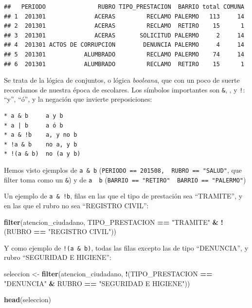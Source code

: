 \documentclass[spanish,]{book}
\newenvironment{Shaded}{\begin{snugshade}}{\end{snugshade}}
\newcommand{\KeywordTok}[1]{\textcolor[rgb]{0.13,0.29,0.53}{\textbf{#1}}}
\newcommand{\NormalTok}[1]{#1}
\newcommand{\OperatorTok}[1]{\textcolor[rgb]{0.81,0.36,0.00}{\textbf{#1}}}
\newcommand{\StringTok}[1]{\textcolor[rgb]{0.31,0.60,0.02}{#1}}
\begin{document}
\begin{verbatim}
##   PERIODO               RUBRO TIPO_PRESTACION  BARRIO total COMUNA
## 1  201301              ACERAS         RECLAMO PALERMO   113     14
## 2  201301              ACERAS         RECLAMO  RETIRO    15      1
## 3  201301              ACERAS       SOLICITUD PALERMO     2     14
## 4  201301 ACTOS DE CORRUPCION        DENUNCIA PALERMO     4     14
## 5  201301           ALUMBRADO         RECLAMO PALERMO    74     14
## 6  201301           ALUMBRADO         RECLAMO  RETIRO    15      1
\end{verbatim}

Se trata de la lógica de conjuntos, o lógica \emph{booleana}, que con un poco de suerte recordamos de nuestra época de escolares. Los símbolos importantes son \texttt{\&}, \texttt{\textbar{}}, y \texttt{!}: ``y'', ``ó'', y la negación que invierte preposiciones:

\begin{verbatim}
* a & b     a y b
* a | b     a ó b
* a & !b    a, y no b
* !a & b    no a, y b
* !(a & b)  no (a y b) 
\end{verbatim}

Hemos visto ejemplos de \texttt{a\ \&\ b} (\texttt{PERIODO\ ==\ 201508,\ \ RUBRO\ ==\ "SALUD"}, que filter toma como un \texttt{\&}) y de \texttt{a\ \textbar{}\ b} (\texttt{BARRIO\ ==\ "RETIRO"\ \textbar{}\ BARRIO\ ==\ "PALERMO"})

Un ejemplo de \texttt{a\ \&\ !b}, filas en las que el tipo de prestación sea ``TRAMITE'', y en las que el rubro no sea ``REGISTRO CIVIL'':

\begin{Shaded}
\begin{Highlighting}[]
\KeywordTok{filter}\NormalTok{(atencion_ciudadano, TIPO_PRESTACION }\OperatorTok{==}\StringTok{ "TRAMITE"} \OperatorTok{&}\StringTok{ }\OperatorTok{!}\NormalTok{(RUBRO }\OperatorTok{==}\StringTok{ "REGISTRO CIVIL"}\NormalTok{))}
\end{Highlighting}
\end{Shaded}

Y como ejemplo de \texttt{!(a\ \&\ b)}, todas las filas excepto las de tipo ``DENUNCIA'', y rubro ``SEGURIDAD E HIGIENE'':

\begin{Shaded}
\begin{Highlighting}[]
\NormalTok{seleccion <-}\StringTok{ }\KeywordTok{filter}\NormalTok{(atencion_ciudadano, }\OperatorTok{!}\NormalTok{(TIPO_PRESTACION }\OperatorTok{==}\StringTok{ "DENUNCIA"} \OperatorTok{&}\StringTok{ }\NormalTok{RUBRO }\OperatorTok{==}\StringTok{ "SEGURIDAD E HIGIENE"}\NormalTok{))}

\KeywordTok{head}\NormalTok{(seleccion)}
\end{Highlighting}
\end{Shaded}
\end{document}
